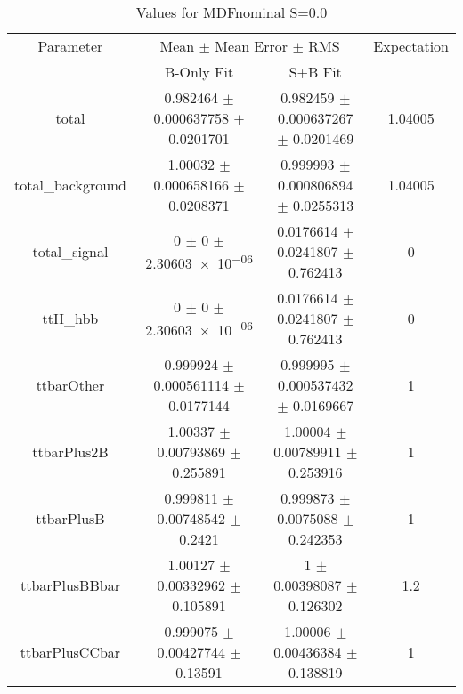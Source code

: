 \begin{table}
\centering
\caption{Values for MDFnominal S=0.0}
\begin{tabular}{cccc}
\toprule
Parameter & \multicolumn{2}{c}{Mean $\pm$ Mean Error $\pm$ RMS} & Expectation\\
 & B-Only Fit & S+B Fit & \\
\midrule
total & \num{0.982464} $\pm$ \num{0.000637758} $\pm$ \num{0.0201701} & \num{0.982459} $\pm$ \num{0.000637267} $\pm$ \num{0.0201469} & \num{1.04005}\\
total\_background & \num{1.00032} $\pm$ \num{0.000658166} $\pm$ \num{0.0208371} & \num{0.999993} $\pm$ \num{0.000806894} $\pm$ \num{0.0255313} & \num{1.04005}\\
total\_signal & \num{0} $\pm$ \num{0} $\pm$ \num{2.30603e-06} & \num{0.0176614} $\pm$ \num{0.0241807} $\pm$ \num{0.762413} & \num{0}\\
ttH\_hbb & \num{0} $\pm$ \num{0} $\pm$ \num{2.30603e-06} & \num{0.0176614} $\pm$ \num{0.0241807} $\pm$ \num{0.762413} & \num{0}\\
ttbarOther & \num{0.999924} $\pm$ \num{0.000561114} $\pm$ \num{0.0177144} & \num{0.999995} $\pm$ \num{0.000537432} $\pm$ \num{0.0169667} & \num{1}\\
ttbarPlus2B & \num{1.00337} $\pm$ \num{0.00793869} $\pm$ \num{0.255891} & \num{1.00004} $\pm$ \num{0.00789911} $\pm$ \num{0.253916} & \num{1}\\
ttbarPlusB & \num{0.999811} $\pm$ \num{0.00748542} $\pm$ \num{0.2421} & \num{0.999873} $\pm$ \num{0.0075088} $\pm$ \num{0.242353} & \num{1}\\
ttbarPlusBBbar & \num{1.00127} $\pm$ \num{0.00332962} $\pm$ \num{0.105891} & \num{1} $\pm$ \num{0.00398087} $\pm$ \num{0.126302} & \num{1.2}\\
ttbarPlusCCbar & \num{0.999075} $\pm$ \num{0.00427744} $\pm$ \num{0.13591} & \num{1.00006} $\pm$ \num{0.00436384} $\pm$ \num{0.138819} & \num{1}\\
\bottomrule
\end{tabular}
\end{table}